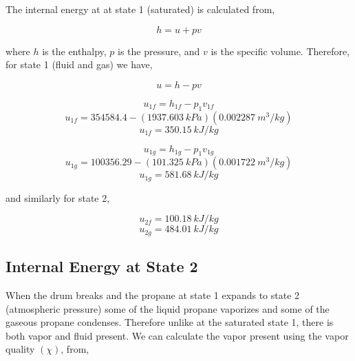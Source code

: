 \documentclass[10pt,parskip=half,
toc=sectionentrywithdots,
bibliography=totocnumbered,
captions=tableheading,numbers=noendperiod]{scrartcl}
\begin{document}
The internal energy at at state 1 (saturated) is calculated from,

\begin{equation}h = u + pv\end{equation}

where \(h\) is the enthalpy, \(p\) is the pressure, and \(v\) is the
specific volume. Therefore, for state 1 (fluid and gas) we have,

\begin{equation}u = h - pv\end{equation}

\begin{equation}u_{1f} = h_{1f} - p_1v_{1f}\end{equation}
\begin{equation}u_{1f} = 354584.4 - (1937.603\:kPa)(0.002287\:m^3/kg)\end{equation}
\begin{equation}u_{1f} = 350.15\:kJ/kg\end{equation}

\begin{equation}u_{1g} = h_{1g} - p_1v_{1g}\end{equation}
\begin{equation}u_{1g} = 100356.29 - (101.325\:kPa)(0.001722\:m^3/kg)\end{equation}
\begin{equation}u_{1g} = 581.68\:kJ/kg\end{equation}

and similarly for state 2,

\begin{equation}u_{2f} = 100.18\:kJ/kg\end{equation}
\begin{equation}u_{2g} = 484.01\:kJ/kg\end{equation}

\hypertarget{internal-energy-at-state-2}{%
\subsection{Internal Energy at State
2}\label{internal-energy-at-state-2}}

When the drum breaks and the propane at state 1 expands to state 2
(atmospheric pressure) some of the liquid propane vaporizes and some of
the gaseous propane condenses. Therefore unlike at the saturated state
1, there is both vapor and fluid present. We can calculate the vapor
present using the vapor quality \((\chi)\), from,
\end{document}
